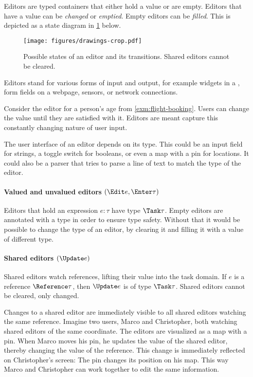 Editors are typed containers that either hold a value or are empty.
Editors that have a value can be \emph{changed} or \emph{emptied}.
Empty editors can be \emph{filled}.
This is depicted as a state diagram in \cref{fig:editor-state} below.

\begin{figure}[h]
  \centering
  \texttt{[image: figures/drawings-crop.pdf]}
  \caption{
    Possible states of an editor and its transitions.
    Shared editors cannot be cleared.
  }
  \label{fig:editor-state}
\end{figure}

Editors stand for various forms of input and output, for example widgets in a \GUI, form fields on a webpage, sensors, or network connections.

Consider the editor for a person's age from \cref{exm:flight-booking}.
Users can change the value until they are satisfied with it.
Editors are meant capture this constantly changing nature of user input.

The user interface of an editor depends on its type.
This could be an input field for strings, a toggle switch for booleans, or even a map with a pin for locations.
It could also be a parser that tries to parse a line of text to match the type of the editor.


\paragraph{Valued and unvalued editors $(\Edit e, \Enter \tau)$}

Editors that hold an expression $e : \tau$ have type $\Task \tau$.
Empty editors are annotated with a type in order to ensure type safety.
Without that it would be possible to change the type of an editor, by clearing it and filling it with a value of different type.

\paragraph{Shared editors $(\Update e)$}

Shared editors watch references, lifting their value into the task domain.
If $e$ is a reference $\Reference \tau$, then $\Update e$ is of type $\Task \tau$.
Shared editors cannot be cleared, only changed.

Changes to a shared editor are immediately visible to all shared editors watching the same reference.
Imagine two users, Marco and Christopher, both watching shared editors of the same coordinate.
The editors are visualized as a map with a pin.
When Marco moves his pin, he updates the value of the shared editor, thereby changing the value of the reference.
This change is immediately reflected on Christopher's screen: The pin changes its position on his map.
This way Marco and Christopher can work together to edit the same information.

